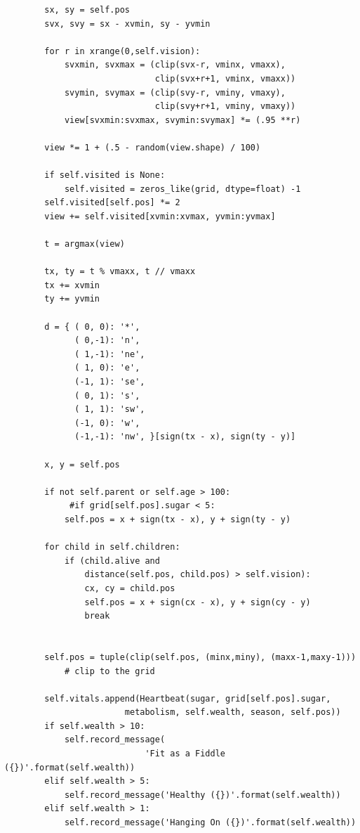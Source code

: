 \begin{verbatim}
        sx, sy = self.pos
        svx, svy = sx - xvmin, sy - yvmin
                    
        for r in xrange(0,self.vision):
            svxmin, svxmax = (clip(svx-r, vminx, vmaxx), 
                              clip(svx+r+1, vminx, vmaxx))
            svymin, svymax = (clip(svy-r, vminy, vmaxy), 
                              clip(svy+r+1, vminy, vmaxy))
            view[svxmin:svxmax, svymin:svymax] *= (.95 **r) 
            
        view *= 1 + (.5 - random(view.shape) / 100)
        
        if self.visited is None:
            self.visited = zeros_like(grid, dtype=float) -1
        self.visited[self.pos] *= 2
        view += self.visited[xvmin:xvmax, yvmin:yvmax]
            
        t = argmax(view)
        
        tx, ty = t % vmaxx, t // vmaxx
        tx += xvmin
        ty += yvmin
        
        d = { ( 0, 0): '*',
              ( 0,-1): 'n', 
              ( 1,-1): 'ne', 
              ( 1, 0): 'e',
              (-1, 1): 'se',
              ( 0, 1): 's',
              ( 1, 1): 'sw',
              (-1, 0): 'w',
              (-1,-1): 'nw', }[sign(tx - x), sign(ty - y)]
        
        x, y = self.pos
        
        if not self.parent or self.age > 100:
             #if grid[self.pos].sugar < 5:   
            self.pos = x + sign(tx - x), y + sign(ty - y)
        
        for child in self.children:
            if (child.alive and 
                distance(self.pos, child.pos) > self.vision):
                cx, cy = child.pos
                self.pos = x + sign(cx - x), y + sign(cy - y)
                break


        self.pos = tuple(clip(self.pos, (minx,miny), (maxx-1,maxy-1))) 
            # clip to the grid

        self.vitals.append(Heartbeat(sugar, grid[self.pos].sugar, 
                        metabolism, self.wealth, season, self.pos))
        if self.wealth > 10:
            self.record_message(
                            'Fit as a Fiddle ({})'.format(self.wealth))
        elif self.wealth > 5:
            self.record_message('Healthy ({})'.format(self.wealth))
        elif self.wealth > 1:
            self.record_message('Hanging On ({})'.format(self.wealth))
\end{verbatim}

